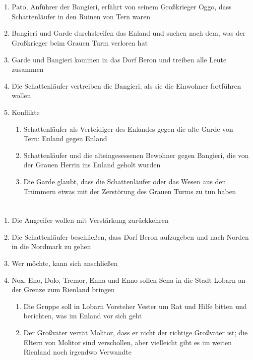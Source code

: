 \documentclass[12pt,a4paper,onecolumn,twoside,ngerman]{book}
\newcommand{\Tern}{Tern}
\newcommand{\Beron}{Beron}
\newcommand{\Molitor}{Molitor}
\newcommand{\Sena}{Sena}
\newcommand{\Bangiri}{Bangieri}
\newcommand{\Pato}{Pato}
\newcommand{\Oggo}{Oggo}
\newcommand{\Enland}{Enland}
\newcommand{\Schattenlaufer}{Schattenläufer}
\newcommand{\Eno}{Eno}
\newcommand{\Dolo}{Dolo}
\newcommand{\Nox}{Nox}
\newcommand{\Enna}{Enna}
\newcommand{\Enno}{Enno}
\newcommand{\Tremor}{Tremor}
\newcommand{\Lobarn}{Lobarn}
\newcommand{\Vester}{Vester}
\newcommand{\Nordmark}{Nordmark}
\newcommand{\Rhinland}{Rienland}
\begin{document}
\section[{\Pato}{s} Rache]{}
\begin{enumerate}
  \item {\Pato}, Anführer der {\Bangiri}, erfährt von seinem Großkrieger {\Oggo}, dass {\Schattenlaufer} in den Ruinen von {\Tern} waren
  \item {\Bangiri} und Garde durchstreifen das {\Enland} und suchen nach dem, was der Großkrieger beim Grauen Turm verloren hat
  \item Garde und {\Bangiri} kommen in das Dorf {\Beron} und treiben alle Leute zusammen
  \item Die {\Schattenlaufer} vertreiben die {\Bangiri}, als sie die Einwohner fortführen wollen
  \item Konflikte
  \begin{enumerate}
    \item {\Schattenlaufer} als Verteidiger des {\Enland}es gegen die alte Garde von Tern: {\Enland} gegen {\Enland} 
    \item {\Schattenlaufer} und die alteingesessenen Bewohner gegen {\Bangiri}, die von der Grauen Herrin ins {\Enland} geholt wurden
    \item Die Garde glaubt, dass die {\Schattenlaufer} oder das Wesen aus den Trümmern etwas mit der Zerstörung des Grauen Turms zu tun haben
  \end{enumerate}
\end{enumerate}

\section[Der Aufbruch]{}
\begin{enumerate}
  \item Die Angreifer wollen mit Verstärkung zurückkehren
  \item Die {\Schattenlaufer} beschließen, dass Dorf {\Beron} aufzugeben und nach Norden in die {\Nordmark} zu gehen
  \item Wer möchte, kann sich anschließen
  \item {\Nox}, {\Eno}, {\Dolo}, {\Tremor}, {\Enna} und {\Enno} sollen {\Sena} in die Stadt {\Lobarn} an der Grenze zum {\Rhinland} bringen
  \begin{enumerate}
    \item Die Gruppe soll in {\Lobarn} Vorsteher {\Vester} um Rat und Hilfe bitten und berichten, was im {\Enland} vor sich geht
    \item Der Großvater verrät {\Molitor}, dass er nicht der richtige Großvater ist; die Eltern von {\Molitor} sind verschollen, aber vielleicht gibt es im weiten {\Rhinland} noch irgendwo Verwandte
  \end{enumerate}
\end{enumerate}
\end{document}
